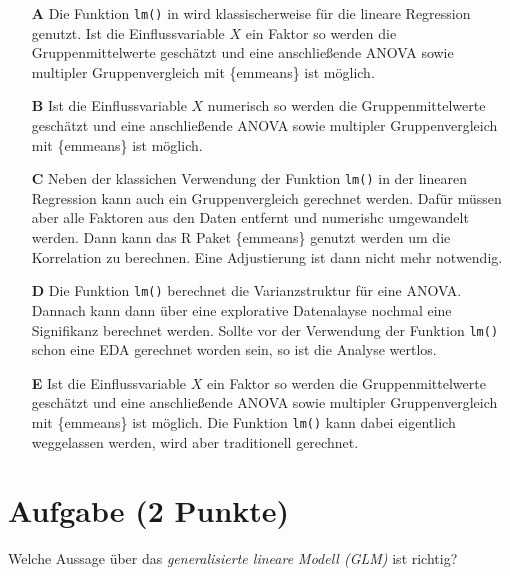 \documentclass[a4paper, 9pt]{scrartcl}\usepackage[]{graphicx}\usepackage[]{xcolor}
\begin{document}
\begin{enumerate}
\item [\textbf{A} \msquare] Die Funktion \texttt{lm()} in \Rlogo wird klassischerweise für die lineare Regression genutzt. Ist die Einflussvariable $X$ ein Faktor so werden die Gruppenmittelwerte geschätzt und eine anschließende ANOVA sowie multipler Gruppenvergleich mit \{emmeans\} ist möglich.
\item [\textbf{B} \msquare] Ist die Einflussvariable $X$ numerisch so werden die Gruppenmittelwerte geschätzt und eine anschließende ANOVA sowie multipler Gruppenvergleich mit \{emmeans\} ist möglich.
\item [\textbf{C} \msquare] Neben der klassichen Verwendung der Funktion \texttt{lm()} in der linearen Regression kann auch ein Gruppenvergleich gerechnet werden. Dafür müssen aber alle Faktoren aus den Daten entfernt und numerishc umgewandelt werden. Dann kann das R Paket \{emmeans\} genutzt werden um die Korrelation zu berechnen. Eine Adjustierung ist dann nicht mehr notwendig.
\item [\textbf{D} \msquare] Die Funktion \texttt{lm()} berechnet die Varianzstruktur für eine ANOVA. Dannach kann dann über eine explorative Datenalayse nochmal eine Signifikanz berechnet werden. Sollte vor der Verwendung der Funktion \texttt{lm()} schon eine EDA gerechnet worden sein, so ist die Analyse wertlos.
\item [\textbf{E} \msquare] Ist die Einflussvariable $X$ ein Faktor so werden die Gruppenmittelwerte geschätzt und eine anschließende ANOVA sowie multipler Gruppenvergleich mit \{emmeans\} ist möglich. Die Funktion \texttt{lm()} kann dabei eigentlich weggelassen werden, wird aber traditionell gerechnet.
\end{enumerate}

\section{Aufgabe \hfill (2 Punkte)}



Welche Aussage über das \textit{generalisierte lineare Modell (GLM)} ist richtig?
\end{document}
